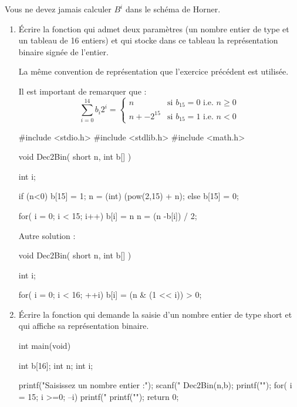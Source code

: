 \begin{warning}
Vous ne devez jamais calculer $B^i$ dans le schéma de Horner.
\end{warning}
 

\begin{enumerate}
  \item Écrire la fonction  qui admet deux paramètres (un nombre entier de type  et un tableau de 16 entiers) et qui stocke dans ce tableau la représentation binaire signée de l'entier.


\begin{correction}
La même convention de représentation que l'exercice précédent est utilisée.

Il est important de remarquer que :
$$\sum_{i=0}^{14}b_i2^i=\begin{cases}
                          n&\text{si }b_{15}=0\text{ i.e. }n\geq0\\ 
                          n+-2^{15}&\text{si }b_{15}=1\text{ i.e. }n<0
                        \end{cases}$$
\end{correction}
\begin{csourcecorrection}
#include <stdio.h>
#include <stdlib.h>
#include <math.h> 

void Dec2Bin( short n, int b[] ) 
{
  int i;

  if (n<0)
  {
    b[15] = 1;
    n = (int) (pow(2,15) + n);
  }
  else
    b[15] = 0;

  for( i = 0; i < 15; i++)
  {
    b[i] = n %
    n = (n -b[i]) / 2;
  }
}
\end{csourcecorrection}
\begin{correction}
Autre solution :
\end{correction}
\begin{csourcecorrection}
void Dec2Bin( short n, int b[] )
{
  int i;

  for( i = 0; i < 16; ++i)
    b[i] = (n & (1 << i)) > 0;
}
\end{csourcecorrection}
  \item Écrire la fonction  qui demande la saisie d'un nombre entier de type short et qui affiche sa représentation binaire.
\begin{csourcecorrection}
int main(void)
{
  int b[16];
  int n;
  int i;

  printf("Saisissez un nombre entier :");
  scanf("%
  Dec2Bin(n,b);
  printf("\n");
  for( i = 15; i >=0; --i)
    printf("%
  printf("\n");
  return 0;
}
\end{csourcecorrection}
\end{enumerate}



